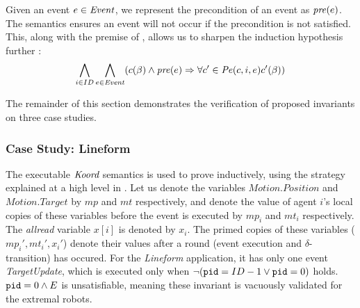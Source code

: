 Given an event $e\in \mathit{Event}$, we represent the precondition of an event as $\mathit{pre}(e)$. The semantics ensures an event will not occur if the precondition is not satisfied. This, along with the premise of , allows us to sharpen the induction hypothesis further :
    $$ \bigwedge_{i\in ID} \bigwedge_{e \in \mathit{Event}}  (c(\beta) \wedge \mathit{pre}(e) \Rightarrow \forall c' \in  \mathit{Pe}(c, i, e) c'(\beta)) $$

 The remainder of this section demonstrates the verification of proposed invariants on three case studies.















\subsubsection*{Case Study: Lineform}
The executable $\emph{Koord}$ semantics is used to prove  inductively, using the strategy explained at a high level in . Let us denote the variables $\mathit{Motion.Position}$ and $\mathit{Motion.Target}$ by $\mathit{mp}$ and $\mathit{mt}$ respectively,  and denote the value of agent $i$'s local copies of these variables before the event is executed by $\mathit{mp}_i$ and $\mathit{mt}_i$ respectively. The \emph{allread} variable $x[i]$ is denoted by $x_i$. The primed copies of these variables ($\mathit{mp_i', mt_i',x_i'}$) denote their values after a round (event execution and $\delta$-transition) has occured. For the \emph{Lineform} application, it has only one event \emph{TargetUpdate}, which is executed only when $\neg (\texttt{pid} = ID - 1 \vee \texttt{pid} = 0)$ holds. $\texttt{pid} = 0 \wedge E$ is unsatisfiable, meaning these invariant is vacuously validated for the extremal robots.


